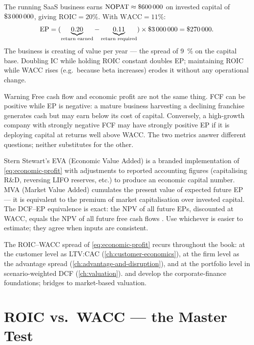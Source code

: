 \begin{example}
The running SaaS business earns \(\mathrm{NOPAT}\approx\$\num{600000}\) on invested capital
of \(\$\num{3000000}\), giving \(\mathrm{ROIC}=20\%\). With \(\mathrm{WACC}=11\%\):
\[
  \mathrm{EP}
    = (\underbrace{0.20}_{\text{return earned}} - \underbrace{0.11}_{\text{return required}})
      \times \$\num{3000000}
    = \$\num{270000}.
\]
The business is creating  of value per year --- the spread of \qty{9}{\percent}
on the capital base. Doubling IC while holding ROIC constant doubles EP; maintaining ROIC while
WACC rises (e.g.\ because beta increases) erodes it without any operational change.
\end{example}

\begin{admonition}{Warning}
Free cash flow and economic profit are not the same thing. FCF can be positive while EP is
negative: a mature business harvesting a declining franchise generates cash but may earn below its
cost of capital. Conversely, a high-growth company with strongly negative FCF may have strongly
positive EP if it is deploying capital at returns well above WACC. The two metrics answer
different questions; neither substitutes for the other.
\end{admonition}

Stern Stewart's EVA (Economic Value Added) is a branded implementation of \cref{eq:economic-profit}
with adjustments to reported accounting figures (capitalising R\&D, reversing LIFO reserves, etc.)
to produce an economic capital number. MVA (Market Value Added) cumulates the present value of
expected future EP --- it is equivalent to the premium of market capitalisation over invested
capital. The DCF--EP equivalence is exact: the NPV of all future EPs, discounted at WACC, equals
the NPV of all future free cash flows \parencite{brealey2020}. Use whichever is easier to
estimate; they agree when inputs are consistent.

The ROIC--WACC spread of \cref{eq:economic-profit} recurs throughout the book: at the customer level
as LTV:CAC (\cref{ch:customer-economics}), at the firm level as the advantage spread
(\cref{ch:advantage-and-disruption}), and at the portfolio level in scenario-weighted DCF
(\cref{ch:valuation}). \textcite{ross2022} and \textcite{brealey2020} develop the corporate-finance
foundations; \textcite{berk6thcorporate} bridges to market-based valuation.

\section{ROIC vs.\ WACC --- the Master Test}\label{sec:roic-wacc}

